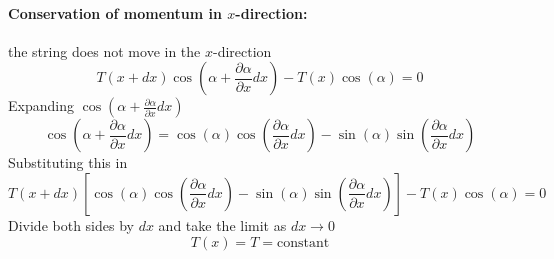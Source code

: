 \documentclass[letterpaper,twocolumn,notitlepage]{article}
\begin{document}
  \paragraph{Conservation of momentum in $x$-direction:} the string does not move in the $x$-direction
  \begin{equation*}
    T(x+dx)\cos\left(\alpha+\frac{\partial\alpha}{\partial x}dx\right)-T(x)\cos(\alpha)=0
  \end{equation*}
  Expanding $\cos\left(\alpha+\frac{\partial\alpha}{\partial x}dx\right)$
  \begin{equation*}
    \cos\left(\alpha+\frac{\partial\alpha}{\partial x}dx\right)=\cos(\alpha)\cos\left(\frac{\partial\alpha}{\partial x}dx\right)-\sin(\alpha)\sin\left(\frac{\partial\alpha}{\partial x}dx\right)
  \end{equation*}
  Substituting this in
  \begin{equation*}
    T(x+dx)\left[\cos(\alpha)\cos\left(\frac{\partial\alpha}{\partial x}dx\right)-\sin(\alpha)\sin\left(\frac{\partial\alpha}{\partial x}dx\right)\right]-T(x)\cos(\alpha)=0
  \end{equation*}
  Divide both sides by $dx$ and take the limit as $dx\rightarrow0$
  \begin{equation*}
    \boxed{T(x)=T=\text{constant}}
  \end{equation*}
\end{document}
